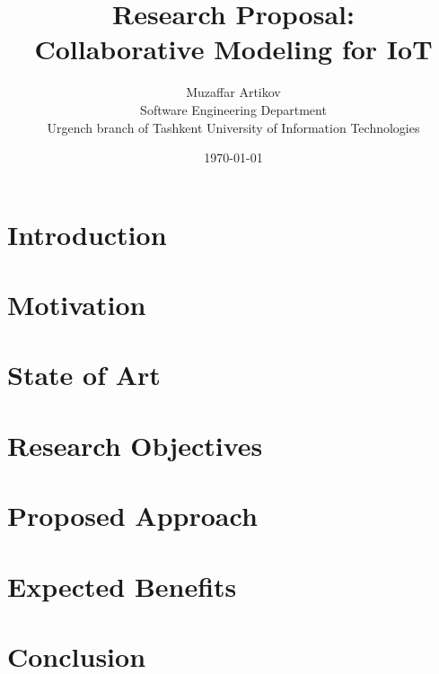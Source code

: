 \documentclass[10pt, oneside]{article}
\title{Research Proposal:\\
Collaborative Modeling for IoT}
\author{Muzaffar Artikov\\
Software Engineering Department\\
Urgench branch of Tashkent University of Information Technologies}
\date{\today}
\begin{document}
\maketitle

\section{Introduction}
\label{sec:introduction}
\section{Motivation}
\label{sec:motivation}
\section{State of Art}
\label{sec:stateofart}
\section{Research Objectives}
\label{sec:researchObjectives}
\section{Proposed Approach}
\label{sec:proposedApproach}
\section{Expected Benefits}
\label{sec:expectedBenefits}
\section{Conclusion}
\label{sec:conclusion}



\end{document}
